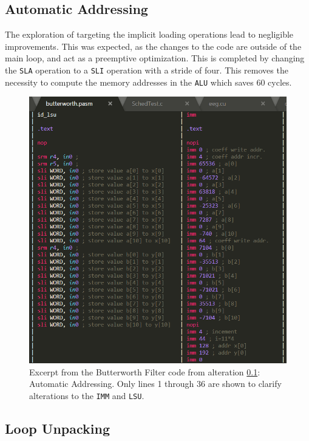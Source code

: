 \documentclass[letterpaper, 10 pt, conference]{ieeeconf}  %
\begin{document}
\subsection{Automatic Addressing}
\label{imp:C}

The exploration of targeting the implicit loading operations lead to negligible improvements. This was expected, as the changes to the code are outside of the main loop, and act as a preemptive optimization. This is completed by changing the \texttt{SLA} operation to a \texttt{SLI} operation with a stride of four. This removes the necessity to compute the memory addresses in the \texttt{ALU} which saves $60$ cycles.

\begin{figure}[h]
\begin{center}
\includegraphics[scale=0.35]{images/assem01.png}
\caption{Excerpt from the Butterworth Filter code from alteration \ref{imp:C}: Automatic Addressing. Only lines 1 through 36 are shown to clarify alterations to the \texttt{IMM} and \texttt{LSU}.}
\label{fig:assem01}
\end{center}
\end{figure}

\subsection{Loop Unpacking}
\label{imp:D}
\end{document}
